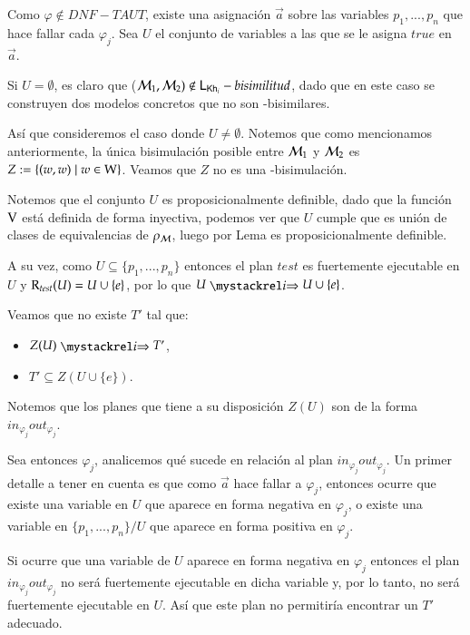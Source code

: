 \begin{demostracion}
\begin{itemize}
    Como $\varphi \notin DNF-TAUT$, existe una asignación $\overrightarrow{a}$ sobre las variables $p_1,...,p_n$ que hace fallar cada $\varphi_j$. Sea $U$ el conjunto de variables a las que se le asigna $true$ en $\overrightarrow{a}$.

    Si $U = \emptyset$, es claro que ($\mathcal{M}_1,\mathcal{M}_2) \notin \mathsf{L}_{\mathsf{Kh}_i}-bisimilitud$, dado que en este caso se construyen dos modelos concretos que no son \KHilogic-bisimilares.

    Así que consideremos el caso donde $U \neq \emptyset$. Notemos que como mencionamos anteriormente, la única bisimulación posible entre $\mathcal{M}_1$ y $\mathcal{M}_2$ es $Z := \{(w,w) \mid w \in \mathrm{W}\}$. Veamos que $Z$ no es una \KHilogic-bisimulación.

    Notemos que el conjunto $U$ es proposicionalmente definible, dado que la función $\mathrm{V}$ está definida de forma inyectiva, podemos ver que $U$ cumple que es unión de clases de equivalencias de $\rho_{\mathcal{M}}$, luego por Lema es proposicionalmente definible.

    A su vez, como $U \subseteq \{p_1,...,p_n\}$ entonces el plan $test$ es fuertemente ejecutable en $U$ y $\mathrm{R}_{test}(U) = U \cup \{e\}$, por lo que $U \ultsExecAgi U \cup \{e\}$.
    
    Veamos que no existe $T'$ tal que:

    \begin{multicols}{2}
        \begin{itemize}
            \item $Z(U) \ultsExecAgi T'$, 
            \item $T' \subseteq Z(U \cup \{e\})$.
        \end{itemize}
    \end{multicols}

    Notemos que los planes que tiene a su disposición $Z(U)$ son de la forma $in_{\varphi_j}out_{\varphi_j}$.

    Sea entonces $\varphi_j$, analicemos qué sucede en relación al plan $in_{\varphi_j}out_{\varphi_j}$. Un primer detalle a tener en cuenta es que como $\overrightarrow{a}$ hace fallar a $\varphi_j$, entonces ocurre que existe una variable en $U$ que aparece en forma negativa en $\varphi_j$, o existe una variable en $\{p_1,...,p_n\}/U$ que aparece en forma positiva en $\varphi_j$.

    Si ocurre que una variable de $U$ aparece en forma negativa en $\varphi_j$ entonces el plan $in_{\varphi_j}out_{\varphi_j}$ no será fuertemente ejecutable en dicha variable y, por lo tanto, no será fuertemente ejecutable en $U$. Así que este plan no permitiría encontrar un $T'$ adecuado.


\end{itemize}
\end{demostracion}
